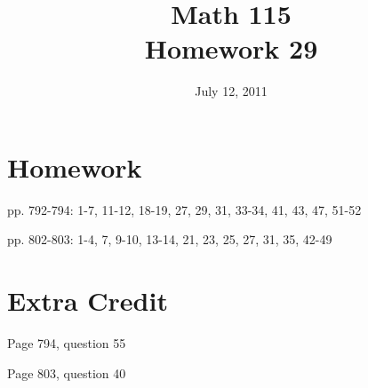\documentclass[fleqn,addpoints]{exam}
\title{Math 115 \\ Homework 29}
\date{July 12, 2011}
\begin{document}
\maketitle



\section{Homework}
\begin{itemize*}
  \item pp. 792-794: 1-7, 11-12, 18-19, 27, 29, 31, 33-34, 41, 43, 47, 51-52
  \item pp. 802-803: 1-4, 7, 9-10, 13-14, 21, 23, 25, 27, 31, 35, 42-49
\end{itemize*}

\section{Extra Credit}
\begin{itemize*}
\item Page 794, question 55
\item Page 803, question 40
\end{itemize*}

\ifprintanswers

\pagebreak
\end{document}
